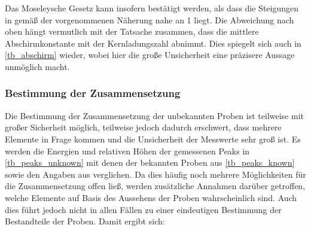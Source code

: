 \documentclass[
	a4paper,
	12pt,
	pagesize,
	ngerman
]{scrartcl}
\begin{document}
	Das Moseleysche Gesetz kann insofern bestätigt werden, als dass die Steigungen in  gemäß der vorgenommenen Näherung nahe an \num{1} liegt.
	Die Abweichung nach oben hängt vermutlich mit der Tatsache zusammen, dass die mittlere Abschirmkonstante mit der Kernladungszahl abnimmt.
	Dies spiegelt sich auch in \cref{tb_abschirm} wieder, wobei hier die große Unsicherheit eine präzisere Aussage unmöglich macht.
	
	\subsubsection{Bestimmung der Zusammensetzung}
	Die Bestimmung der Zusammensetzung der unbekannten Proben ist teilweise mit großer Sicherheit möglich, teilweise jedoch dadurch erschwert, dass mehrere Elemente in Frage kommen und die Unsicherheit der Messwerte sehr groß ist.
	Es werden die Energien und relativen Höhen der gemessenen Peaks in \cref{tb_peaks_unknown} mit denen der bekannten Proben aus \cref{tb_peaks_known} sowie den Angaben aus \cite{XRAYDB} verglichen.
	Da dies häufig noch mehrere Möglichkeiten für die Zusammensetzung offen ließ, werden zusätzliche Annahmen darüber getroffen, welche Elemente auf Basis des Aussehens der Proben wahrscheinlich sind.
	Auch dies führt jedoch nicht in allen Fällen zu einer eindeutigen Bestimmung der Bestandteile der Proben.
	Damit ergibt sich:
	
\end{document}
